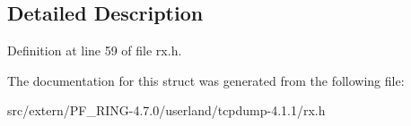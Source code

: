 

\subsection{Detailed Description}


Definition at line 59 of file rx.h.



The documentation for this struct was generated from the following file:\begin{DoxyCompactItemize}
\item 
src/extern/PF\_\-RING-\/4.7.0/userland/tcpdump-\/4.1.1/rx.h\end{DoxyCompactItemize}
